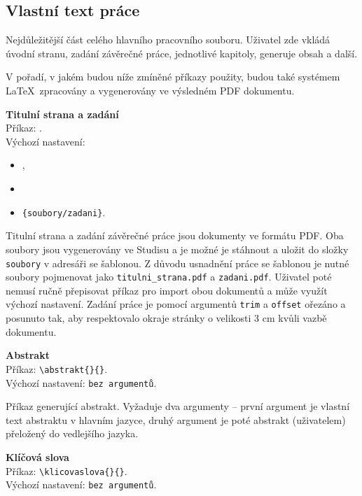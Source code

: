 \subsection{Vlastní text práce}
\label{subsec:nalezitosti}
Nejdůležitější část celého hlavního pracovního souboru. Uživatel zde vkládá úvodní stranu, zadání závěrečné práce, jednotlivé kapitoly, generuje obsah a další.

V pořadí, v jakém budou níže zmíněné příkazy použity, budou také systémem \LaTeX\ zpracovány a vygenerovány ve výsledném PDF dokumentu.

\textbf{Titulní strana a zadání}\\
Příkaz: \verb||.\\
Výchozí nastavení:

\begin{itemize}[label={-}]
	\item \verb||,
	\item \verb||
	\item[ ]\hspace{70pt}\verb|{soubory/zadani}|.
\end{itemize}

Titulní strana a zadání závěrečné práce jsou dokumenty ve formátu PDF. Oba soubory jsou vygenerovány ve Studisu a je možné je stáhnout a uložit do složky \verb|soubory| v adresáři se šablonou. Z důvodu usnadnění práce se šablonou je nutné soubory pojmenovat jako \verb|titulni_strana.pdf| a \verb|zadani.pdf|. Uživatel poté nemusí ručně přepisovat příkaz pro import obou dokumentů a může využít výchozí nastavení. Zadání práce je pomocí argumentů \verb|trim| a \verb|offset| ořezáno a posunuto tak, aby respektovalo okraje stránky o velikosti 3 cm kvůli vazbě dokumentu.

\vspace{8pt}

\textbf{Abstrakt}\\
Příkaz: \verb|\abstrakt{}{}|.\\
Výchozí nastavení: \verb|bez argumentů|.

Příkaz generující abstrakt. Vyžaduje dva argumenty -- první argument je vlastní text abstraktu v hlavním jazyce, druhý argument je poté abstrakt (uživatelem) přeložený do vedlejšího jazyka.

\vspace{8pt}

\textbf{Klíčová slova}\\
Příkaz: \verb|\klicovaslova{}{}|.\\
Výchozí nastavení: \verb|bez argumentů|.

